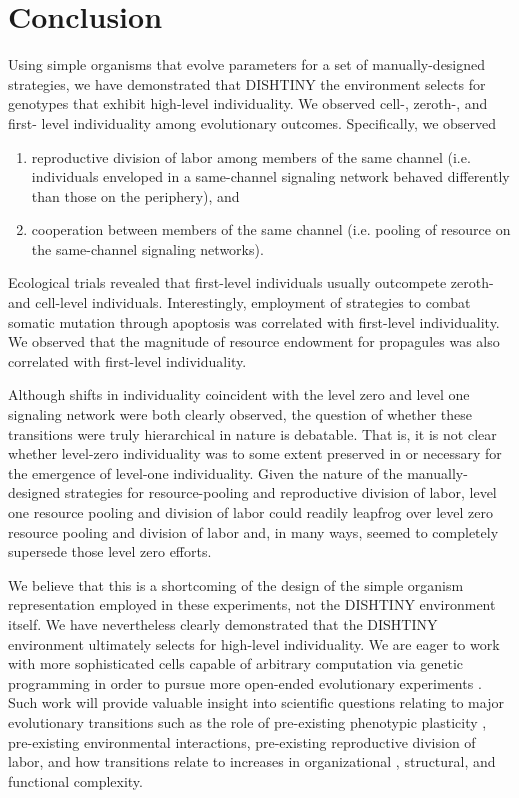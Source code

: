 \section{Conclusion}

Using simple organisms that evolve parameters for a set of manually-designed strategies, we have demonstrated that DISHTINY the environment selects for genotypes that exhibit high-level individuality.
We observed cell-, zeroth-, and first- level individuality among evolutionary outcomes.
Specifically, we observed
\begin{enumerate}
  \item reproductive division of labor among members of the same channel (i.e. individuals enveloped in a same-channel signaling network behaved differently than those on the periphery), and
  \item cooperation between members of the same channel (i.e. pooling of resource on the same-channel signaling networks).
\end{enumerate}

Ecological trials revealed that first-level individuals usually outcompete zeroth- and cell-level individuals.
Interestingly, employment of strategies to combat somatic mutation through apoptosis was correlated with first-level individuality.
We observed that the magnitude of resource endowment for propagules was also correlated with first-level individuality.

Although shifts in individuality coincident with the level zero and level one signaling network were both clearly observed, the question of whether these transitions were truly hierarchical in nature is debatable.
That is, it is not clear whether level-zero individuality was to some extent preserved in or necessary for the emergence of level-one individuality.
Given the nature of the manually-designed strategies for resource-pooling and reproductive division of labor, level one resource pooling and division of labor could readily leapfrog over level zero resource pooling and division of labor and, in many ways, seemed to completely supersede those level zero efforts.

We believe that this is a shortcoming of the design of the simple organism representation employed in these experiments, not the DISHTINY environment itself.
We have nevertheless clearly demonstrated that the DISHTINY environment ultimately selects for high-level individuality.
We are eager to work with more sophisticated cells capable of arbitrary computation via genetic programming in order to pursue more open-ended evolutionary experiments \cite{ofria2004avida}.
Such work will provide valuable insight into scientific questions relating to major evolutionary transitions such as the role of pre-existing phenotypic plasticity \citep{clune2007investigating, lalejini2016evolutionary}, pre-existing environmental interactions, pre-existing reproductive division of labor, and how transitions relate to increases in organizational \citep{goldsby2012task}, structural, and functional \citep{goldsby2014evolutionary} complexity.

